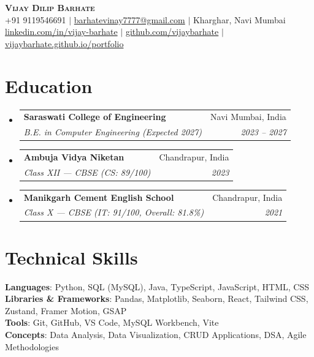 \documentclass[letterpaper,11pt]{article}
\makeatletter
\newcommand{\resumeSubheading}[4]{
  \vspace{-2pt}\item
    \begin{tabular*}{0.97\textwidth}[t]{l@{\extracolsep{\fill}}r}
      \textbf{#1} & #2 \\
      \textit{\small#3} & \textit{\small #4} \\
    \end{tabular*}\vspace{-7pt}
}
\newcommand{\resumeSubHeadingListStart}{\begin{itemize}[leftmargin=0.15in, label={}]}
\newcommand{\resumeSubHeadingListEnd}{\end{itemize}}
\makeatother
\begin{document}
\begin{center}
    \textbf{\Huge \scshape Vijay Dilip Barhate} \\ \vspace{1pt}
    \small +91 9119546691 $|$
    \href{mailto:barhatevinay7777@gmail.com}{barhatevinay7777@gmail.com} $|$
    Kharghar, Navi Mumbai \\
    \href{https://linkedin.com/in/vijay-barhate}{linkedin.com/in/vijay-barhate} $|$
    \href{https://github.com/vijaybarhate}{github.com/vijaybarhate} $|$
    \href{https://vijaybarhate.github.io/portfolio}{vijaybarhate.github.io/portfolio}
\end{center}

\section{Education}
\resumeSubHeadingListStart
  \resumeSubheading
    {Saraswati College of Engineering}{Navi Mumbai, India}
    {B.E. in Computer Engineering (Expected 2027)}{2023 -- 2027}
  \resumeSubheading
    {Ambuja Vidya Niketan}{Chandrapur, India}
    {Class XII --- CBSE (CS: 89/100)}{2023}
  \resumeSubheading
    {Manikgarh Cement English School}{Chandrapur, India}
    {Class X --- CBSE (IT: 91/100, Overall: 81.8\%)}{2021}
\resumeSubHeadingListEnd

\section{Technical Skills}
\begin{itemize}[leftmargin=0.15in, label={}]
  \small{\item{
    \textbf{Languages}{: Python, SQL (MySQL), Java, TypeScript, JavaScript, HTML, CSS} \\
    \textbf{Libraries \& Frameworks}{: Pandas, Matplotlib, Seaborn, React, Tailwind CSS, Zustand, Framer Motion, GSAP} \\
    \textbf{Tools}{: Git, GitHub, VS Code, MySQL Workbench, Vite} \\
    \textbf{Concepts}{: Data Analysis, Data Visualization, CRUD Applications, DSA, Agile Methodologies}
  }}
\end{itemize}

\end{document}
